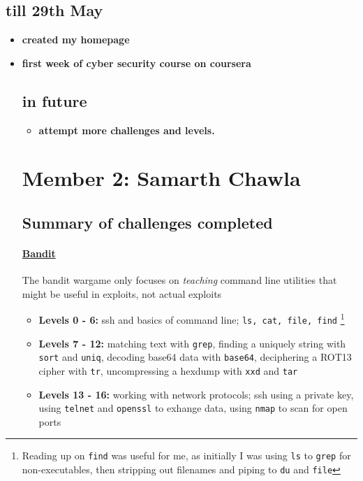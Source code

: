 \documentclass{article}
\def\code#1{\texttt{#1}}
\begin{document}
\subsection*{till 29th May}
\begin{itemize}
    \item \textbf{created my homepage}
    \item \textbf{first week of cyber security course on coursera}
\subsection*{in future}
\begin{itemize}
    \item \textbf{attempt more challenges and levels.}
\end{itemize}

\newpage
\section*{Member 2: Samarth Chawla}
\subsection*{Summary of challenges completed}

\paragraph{\href{http://overthewire.org/wargames/bandit/}{Bandit}}
The bandit wargame only focuses on \textit{teaching} command line utilities that might be useful in exploits, not actual exploits
\begin{itemize}
    
    \item \textbf{Levels 0 - 6: } ssh and basics of command line; \code{ls, cat, file, find} \footnote{Reading up on \code{find} was useful for me, as initially I was using \code{ls} to \code{grep} for non-executables, then stripping out filenames and piping to \code{du} and \code{file}}
    
    \item \textbf{Levels 7 - 12: } matching text with \code{grep}, finding a uniquely string with \code{sort} and \code{uniq}, decoding base64 data with \code{base64}, deciphering a ROT13 cipher with \code{tr}, uncompressing a hexdump with \code{xxd} and \code{tar}
    
    \item \textbf{Levels 13 - 16: } working with network protocols; ssh using a private key, using \code{telnet} and \code{openssl} to exhange data, using \code{nmap} to scan for open ports
    

\end{itemize}
\end{itemize}
\end{document}

